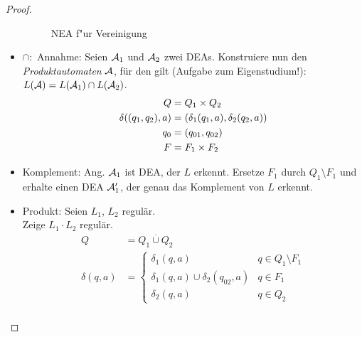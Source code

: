 \begin{proof}
\begin{itemize}
\begin{figure}[tp]
            \caption{\acs{NEA} f"ur Vereinigung}
            \label{fig:reg-closure-union}
        \end{figure}
        \item $\cap:$ 
        Annahme: Seien $\mathcal{A}_1$ und $\mathcal{A}_2$ zwei DEAs. Konstruiere nun  den \emph{Produktautomaten} $\mathcal{A}$, für den gilt (Aufgabe zum Eigenstudium!): $L(\mathcal{A}) = L(\mathcal{A}_1) \cap L(\mathcal{A}_2)$.
		\begin{align*}
			Q &= Q_1\times Q_2\\
			\delta((q_1,q_2),a) &= (\delta_1(q_1,a),\delta_2(q_2,a))\\
			q_0 &= (q_{01},q_{02})\\
			F &= F_1\times F_2\\
		\end{align*}
	\item Komplement: Ang. $\mathcal{A}_1$ ist \ac{DEA}, der $L$ erkennt. Ersetze $F_1$ durch $Q_1\setminus F_1$ und erhalte einen DEA $\mathcal{A}_1'$, der genau das Komplement von $L$ erkennt. 
%
%
        \item Produkt: Seien $L_1$, $L_2$ regulär.\\
                Zeige $L_1\cdot L_2$ regulär.
                \begin{align*}
                        Q &= Q_1 \overset.\cup Q_2\\
                        \delta(q,a) &=
                                \begin{cases}
                                        \delta_1(q,a) & q\in Q_1\setminus F_1\\
                                        \delta_1(q,a)\cup\delta_2(q_{02},a) & q\in F_1\\
                                        \delta_2(q,a) & q\in Q_2
                                \end{cases}\\

\end{align*}
\end{itemize}
\end{proof}
